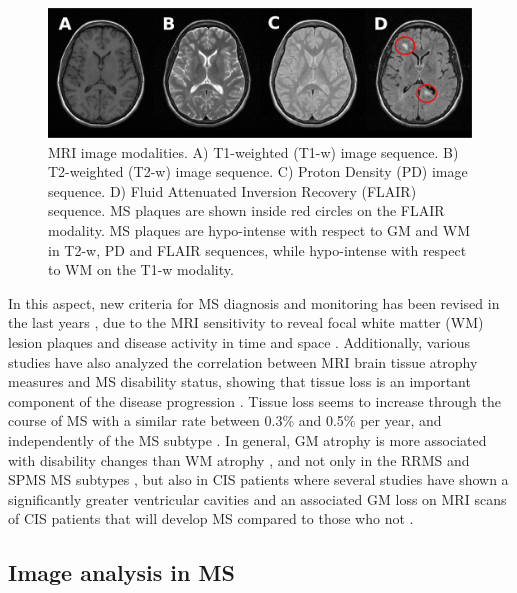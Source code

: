 \begin{figure}[top]
  \begin{center}
    \includegraphics[width=1\textwidth]{figures/figure_1.eps}
  \end{center}
    \caption{MRI image modalities. A) T1-weighted (T1-w) image sequence. B) T2-weighted (T2-w) image sequence. C) Proton Density (PD) image sequence. D) Fluid Attenuated Inversion Recovery (FLAIR) sequence. MS plaques are shown inside red circles on the FLAIR modality. MS plaques are hypo-intense with respect to GM and WM in T2-w, PD and FLAIR sequences, while hypo-intense with respect to WM on the T1-w modality.}
    \label{mri_modalities}
\end{figure}

In this aspect, new criteria for MS diagnosis and monitoring has been revised in the last years \cite{Polman2011}, due to the MRI sensitivity to reveal focal white matter (WM) lesion plaques and disease activity in time and space \cite{Filippi2011}. Additionally, various studies have also analyzed the correlation between MRI brain tissue atrophy measures and MS disability status, showing that tissue loss is an important component of the disease progression \cite{Chard2002, Filippi2013, Fisher2008, Rudick2009}. Tissue loss seems to increase through the course of MS with a similar rate between 0.3\% and 0.5\% per year, and independently of the MS subtype \cite{DeStefano2010, Rudick2009}. In general, GM atrophy is more associated with disability changes than WM atrophy \cite{Fisniku2008}, and not only in the RRMS and SPMS MS subtypes \cite{Fisher2008, Rudick2009}, but also in CIS patients where several studies have shown a significantly greater ventricular cavities and an associated GM loss on MRI scans of CIS patients that will develop MS compared to those who not \cite{Ceccarelli2010,Filippi2013}.

\subsection{Image analysis in MS}
\label{subsec:image_analysis}

